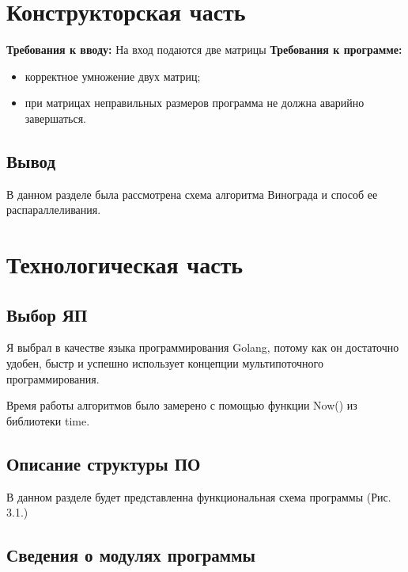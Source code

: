 \documentclass[12pt]{report}
\begin{document}
\chapter{Конструкторская часть}
\textbf{Требования к вводу:}
На вход подаются две матрицы
\newline
\textbf{Требования к программе:}
\begin{itemize}
	\item корректное умножение двух матриц;
	\item при матрицах неправильных размеров программа не должна аварийно завершаться.
\end{itemize}



\section{Вывод}
В данном разделе была рассмотрена схема алгоритма Винограда и способ ее распараллеливания.

\chapter{Технологическая часть}
\section{Выбор ЯП}
Я выбрал в качестве языка программирования Golang, потому как он достаточно удобен, быстр и успешно использует концепции мультипоточного программирования.

Время работы алгоритмов было замерено с помощью функции Now() из библиотеки time.

\section{Описание структуры ПО}
В данном разделе будет представленна функциональная схема программы (Рис. 3.1.)

\section{Сведения о модулях программы}
\end{document}
